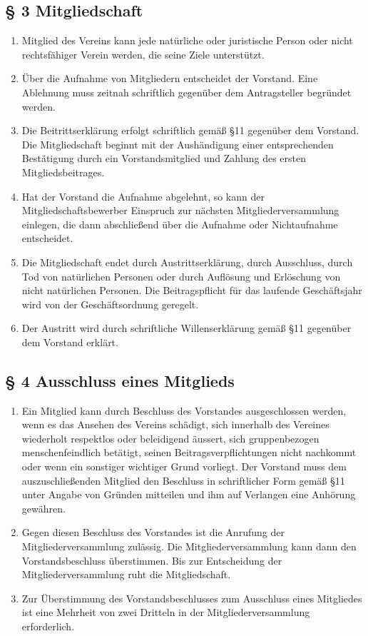 ﻿\documentclass[10pt,a4paper]{scrartcl}
\begin{document}
\subsection*{§ 3 Mitgliedschaft}
\begin{enumerate}
	\item Mitglied des Vereins kann jede natürliche oder juristische Person oder
		nicht rechts\-fähiger Verein werden, die seine Ziele unterstützt.
        \item Über die Aufnahme von Mitgliedern entscheidet der Vorstand. Eine Ablehnung muss zeitnah schriftlich gegenüber dem Antragsteller begründet werden.
	\item Die Beitrittserklärung erfolgt schriftlich gemäß §11 gegenüber dem Vorstand. Die
		Mitgliedschaft beginnt mit der Aushändigung einer entsprechenden Bestätigung durch
                ein Vorstandsmitglied und Zahlung des ersten Mitgliedsbeitrages.
	\item Hat der Vorstand die Aufnahme abgelehnt, so kann der Mitgliedschaftsbewerber Einspruch
		zur nächsten Mitgliederversammlung einlegen, die dann abschließend über die Aufnahme
		oder Nichtaufnahme entscheidet.
	\item Die Mitgliedschaft endet durch Austrittserklärung, durch Ausschluss, durch Tod von
		natür\-li\-chen Personen oder durch Auflösung und Erlöschung von nicht
		natür\-lichen Personen.
		Die Beitragspflicht für das laufende Geschäftsjahr wird von der Geschäftsordnung
		geregelt.
	\item Der Austritt wird durch schriftliche Willenserklärung gemäß §11 gegenüber dem Vorstand
		erklärt.
\end{enumerate}
%
%
\subsection*{§ 4 Ausschluss eines Mitglieds }
\begin{enumerate}
	\item Ein Mitglied kann durch Beschluss des Vorstandes ausgeschlossen werden, wenn es das
                Ansehen des Vereins schädigt, sich innerhalb des Vereines wiederholt respektlos oder 
                beleidigend äussert, sich gruppenbezogen menschenfeindlich betätigt, seinen Beitragsverpflichtungen nicht nachkommt oder 
		wenn ein sonstiger wichtiger Grund vorliegt. Der Vorstand muss dem auszuschließenden
		Mitglied den Beschluss in schriftlicher Form gemäß §11 unter Angabe von Gründen
		mitteilen und ihm auf Verlangen eine Anhörung gewähren.
        \item Gegen diesen Beschluss des Vorstandes ist die Anrufung der Mitgliederversammlung zu\-läs\-sig. Die Mitgliederversammlung kann dann den Vorstandsbeschluss überstimmen.
				Bis zur Entscheidung der Mitgliederversammlung ruht die Mitgliedschaft.
		\item Zur Überstimmung des Vorstandsbeschlusses zum Ausschluss eines Mitgliedes ist eine Mehrheit von zwei Dritteln in der Mitgliederversammlung erforderlich.
	
\end{enumerate}
%
%
\end{document}
